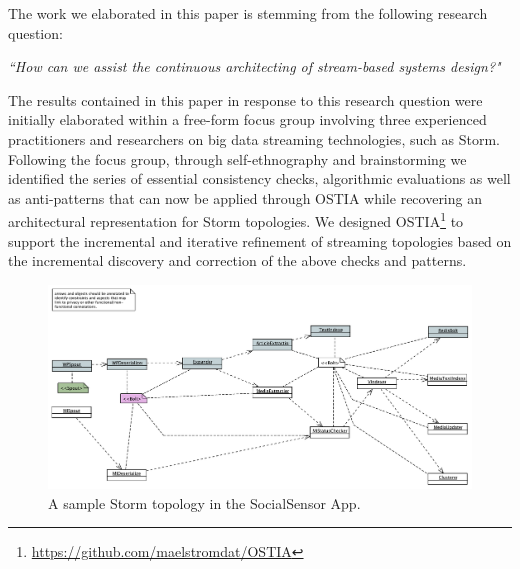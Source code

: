 
The work we elaborated in this paper is stemming from the following research question:

\begin{center}
\emph{``How can we assist the continuous architecting of stream-based systems design?"}
\end{center}

The results contained in this paper in response to this research question were initially elaborated within a free-form focus group \cite{focusgroup} involving three experienced practitioners and researchers on big data streaming technologies, such as Storm. Following the focus group, through self-ethnography \cite{selfeth} and brainstorming we identified the series of essential consistency checks, algorithmic evaluations as well as anti-patterns that can now be applied through OSTIA while recovering an architectural representation for Storm topologies. We designed OSTIA\footnote{\url{https://github.com/maelstromdat/OSTIA}} to support the incremental and iterative refinement of streaming topologies based on the incremental discovery and correction of the above checks and patterns.

\begin{figure}
\begin{center}
\includegraphics[width=12cm]{images/socialsensor}
\caption{A sample Storm topology in the SocialSensor App.}
\end{center}
\label{topo1}
\end{figure}

